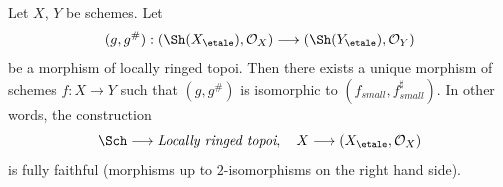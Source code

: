 %
\begin{theorem}
\label{theorem-fully-faithful}
Let $X$, $Y$ be schemes. Let
$$
(g, g^\#) :
(\Sh(X_\etale), \mathcal{O}_X)
\longrightarrow
(\Sh(Y_\etale), \mathcal{O}_Y)
$$
be a morphism of locally ringed topoi. Then there exists a
unique morphism of schemes $f : X \to Y$ such that
$(g, g^\#)$ is isomorphic to $(f_{small}, f_{small}^\sharp)$.
In other words, the construction
$$
\Sch \longrightarrow \textit{Locally ringed topoi},
\quad
X \longrightarrow (X_\etale, \mathcal{O}_X)
$$
is fully faithful (morphisms up to $2$-isomorphisms on the right hand side).
\end{theorem}

